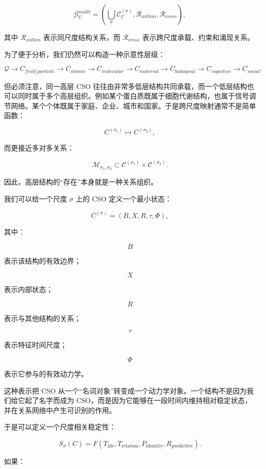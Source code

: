\[
\boxed{
\mathcal{G}_{U}^{multi}
=
\left(
\bigcup_{\sigma}\mathcal{C}_{U}^{(\sigma)},
\mathcal{R}_{within},
\mathcal{R}_{cross}
\right),
}
\]

其中 $\mathcal{R}_{within}$ 表示同尺度结构关系，而 $\mathcal{R}_{cross}$ 表示跨尺度承载、约束和涌现关系。

为了便于分析，我们仍然可以构造一种示意性层级：

\[
\mathcal Q
\rightarrow
C_{field/particle}
\rightarrow
C_{atomic}
\rightarrow
C_{molecular}
\rightarrow
C_{material}
\rightarrow
C_{biological}
\rightarrow
C_{cognitive}
\rightarrow
C_{social}.
\]

但必须注意，同一高层 CSO 往往由非常多低层结构共同承载，而一个低层结构也可以同时属于多个高层组织。例如某个蛋白质既属于细胞代谢结构，也属于信号调节网络。某个个体既属于家庭、企业、城市和国家。于是跨尺度映射通常不是简单函数：

\[
C^{(\sigma_1)}
\mapsto
C^{(\sigma_2)},
\]

而更接近多对多关系：

\[
\mathcal{M}_{\sigma_1,\sigma_2}
\subset
\mathcal{C}^{(\sigma_1)}
\times
\mathcal{C}^{(\sigma_2)}.
\]

因此，高层结构的“存在”本身就是一种关系组织。

我们可以给一个尺度 $\sigma$ 上的 CSO 定义一个最小状态：

\[
C^{(\sigma)}
=
\left(
B,
X,
R,
\tau,
\Phi
\right),
\]

其中：

\[
B
\]

表示该结构的有效边界；

\[
X
\]

表示内部状态；

\[
R
\]

表示与其他结构的关系；

\[
\tau
\]

表示特征时间尺度；

\[
\Phi
\]

表示它参与的有效动力学。

这种表示把 CSO 从一个“名词对象”转变成一个动力学对象。一个结构不是因为我们给它起了名字而成为 CSO，而是因为它能够在一段时间内维持相对稳定状态，并在关系网络中产生可识别的作用。

于是可以定义一个尺度相关稳定性：

\[
S_{\sigma}(C)
=
F
\left(
T_{\mathrm{life}},
T_{\mathrm{relation}},
P_{\mathrm{identity}},
R_{\mathrm{predictive}}
\right).
\]

如果：


